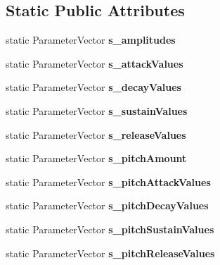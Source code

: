 \subsection*{Static Public Attributes}
\begin{DoxyCompactItemize}
\item 
static Parameter\+Vector {\bfseries s\+\_\+amplitudes}\hypertarget{class_synth_audio_processor_acf4aa2d3317ec70bd755d2a16cab1696}{}\label{class_synth_audio_processor_acf4aa2d3317ec70bd755d2a16cab1696}

\item 
static Parameter\+Vector {\bfseries s\+\_\+attack\+Values}\hypertarget{class_synth_audio_processor_a619d65cd8d80d45856f5dae732244a93}{}\label{class_synth_audio_processor_a619d65cd8d80d45856f5dae732244a93}

\item 
static Parameter\+Vector {\bfseries s\+\_\+decay\+Values}\hypertarget{class_synth_audio_processor_a8e06230b271edc52e64f0d3f3d05421b}{}\label{class_synth_audio_processor_a8e06230b271edc52e64f0d3f3d05421b}

\item 
static Parameter\+Vector {\bfseries s\+\_\+sustain\+Values}\hypertarget{class_synth_audio_processor_a8c55f8f38de7fca6b35d176d5a7ea880}{}\label{class_synth_audio_processor_a8c55f8f38de7fca6b35d176d5a7ea880}

\item 
static Parameter\+Vector {\bfseries s\+\_\+release\+Values}\hypertarget{class_synth_audio_processor_aab7b87dbd8e4b451d2dab61d9aacf195}{}\label{class_synth_audio_processor_aab7b87dbd8e4b451d2dab61d9aacf195}

\item 
static Parameter\+Vector {\bfseries s\+\_\+pitch\+Amount}\hypertarget{class_synth_audio_processor_a82442aece377064a9ffe03a0a6a32538}{}\label{class_synth_audio_processor_a82442aece377064a9ffe03a0a6a32538}

\item 
static Parameter\+Vector {\bfseries s\+\_\+pitch\+Attack\+Values}\hypertarget{class_synth_audio_processor_aad58c8fefc6fc6b49e32eedcef5c96f6}{}\label{class_synth_audio_processor_aad58c8fefc6fc6b49e32eedcef5c96f6}

\item 
static Parameter\+Vector {\bfseries s\+\_\+pitch\+Decay\+Values}\hypertarget{class_synth_audio_processor_a396b74657064f7d2a407aa2fb632a70e}{}\label{class_synth_audio_processor_a396b74657064f7d2a407aa2fb632a70e}

\item 
static Parameter\+Vector {\bfseries s\+\_\+pitch\+Sustain\+Values}\hypertarget{class_synth_audio_processor_ad4ba38a503e514d6595f86d8b3587194}{}\label{class_synth_audio_processor_ad4ba38a503e514d6595f86d8b3587194}

\item 
static Parameter\+Vector {\bfseries s\+\_\+pitch\+Release\+Values}\hypertarget{class_synth_audio_processor_af7f52d75e7a47577372aa646fba7bf06}{}\label{class_synth_audio_processor_af7f52d75e7a47577372aa646fba7bf06}

\end{DoxyCompactItemize}


